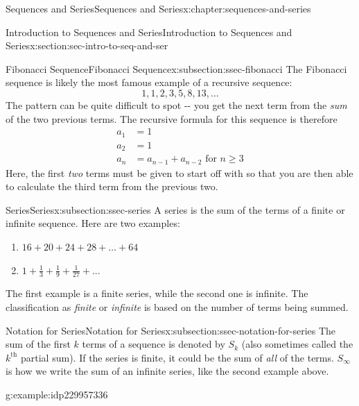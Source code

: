 \documentclass[twoside,10pt,]{book}
\numberwithin{equation}{section}
\newcommand{\kth}{{k^{\text{th}}}}
\newcommand{\infinity}{{\infty}}
\newcommand{\amp}{&}
\begin{document}
\begin{chapterptx}{Sequences and Series}{}{Sequences and Series}{}{}{x:chapter:sequences-and-series}
\begin{sectionptx}{Introduction to Sequences and Series}{}{Introduction to Sequences and Series}{}{}{x:section:sec-intro-to-seq-and-ser}
%
%
\typeout{************************************************}
\typeout{************************************************}
%
\begin{subsectionptx}{Fibonacci Sequence}{}{Fibonacci Sequence}{}{}{x:subsection:ssec-fibonacci}
The Fibonacci sequence is likely the most famous example of a recursive sequence: %
\begin{equation*}
1, 1, 2, 3, 5, 8, 13, \ldots
\end{equation*}
The pattern can be quite difficult to spot -{}-{} you get the next term from the \emph{sum} of the two previous terms.  The recursive formula for this sequence is therefore%
\begin{align*}
{a_1} \amp = 1\\
{a_2} \amp = 1\\
{a_n} \amp = {a_{n - 1}} + {a_{n - 2}} \text{ for } n \ge 3
\end{align*}
Here, the first \emph{two} terms must be given to start off with so that you are then able to calculate the third term from the previous two.%
\end{subsectionptx}
%
%
\typeout{************************************************}
\typeout{************************************************}
%
\begin{subsectionptx}{Series}{}{Series}{}{}{x:subsection:ssec-series}
A series is the sum of the terms of a finite or infinite sequence.  Here are two examples:%
\begin{enumerate}[label=(\alph*)]
\item{}\(\displaystyle 16 + 20 + 24 + 28 + \ldots + 64\)%
\item{}\(\displaystyle 1 + \frac{1}{3} + \frac{1}{9} + \frac{1}{{27}} + ...\)%
\end{enumerate}
The first example is a finite series, while the second one is infinite. The classification as \emph{finite} or \emph{infinite} is based on the number of terms being summed.%
\end{subsectionptx}
%
%
\typeout{************************************************}
\typeout{************************************************}
%
\begin{subsectionptx}{Notation for Series}{}{Notation for Series}{}{}{x:subsection:ssec-notation-for-series}
The sum of the first \(k\) terms of a sequence is denoted by \(S_k\) (also sometimes called the \(\kth{}\) partial sum).  If the series is finite, it could be the sum of \emph{all} of the terms.  \(S_\infinity\) is how we write the sum of an infinite series, like the second example above. \begin{example}{}{g:example:idp229957336}%

\end{example}
\end{subsectionptx}
\end{sectionptx}
\end{chapterptx}
\end{document}
